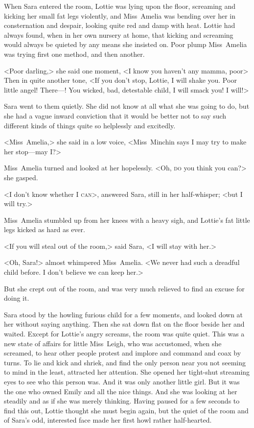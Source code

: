 When Sara entered the room, Lottie was lying upon the floor, screaming and kicking her small fat legs violently, and Miss~Amelia was bending over her in consternation and despair, looking quite red and damp with heat. Lottie had always found, when in her own nursery at home, that kicking and screaming would always be quieted by any means she insisted on. Poor plump Miss~Amelia was trying first one method, and then another.

<Poor darling,> she said one moment, <I know you haven't any mamma, poor\longdash> Then in quite another tone, <If you don't stop, Lottie, I will shake you. Poor little angel! There—! You wicked, bad, detestable child, I will smack you! I will!>

Sara went to them quietly. She did not know at all what she was going to do, but she had a vague inward conviction that it would be better not to say such different kinds of things quite so helplessly and excitedly.

<Miss~Amelia,> she said in a low voice, <Miss~Minchin says I may try to make her stop—may I\@?>

Miss~Amelia turned and looked at her hopelessly. <Oh, \textsc{do} you think you can?> she gasped.

<I don't know whether I \textsc{can}>, answered Sara, still in her half-whisper; <but I will try.>

Miss~Amelia stumbled up from her knees with a heavy sigh, and Lottie's fat little legs kicked as hard as ever.

<If you will steal out of the room,> said Sara, <I will stay with her.>

<Oh, Sara!> almost whimpered Miss~Amelia. <We never had such a dreadful child before. I don't believe we can keep her.>

But she crept out of the room, and was very much relieved to find an excuse for doing it.

Sara stood by the howling furious child for a few moments, and looked down at her without saying anything. Then she sat down flat on the floor beside her and waited. Except for Lottie's angry screams, the room was quite quiet. This was a new state of affairs for little Miss~Leigh, who was accustomed, when she screamed, to hear other people protest and implore and command and coax by turns. To lie and kick and shriek, and find the only person near you not seeming to mind in the least, attracted her attention. She opened her tight-shut streaming eyes to see who this person was. And it was only another little girl. But it was the one who owned Emily and all the nice things. And she was looking at her steadily and as if she was merely thinking. Having paused for a few seconds to find this out, Lottie thought she must begin again, but the quiet of the room and of Sara's odd, interested face made her first howl rather half-hearted.

